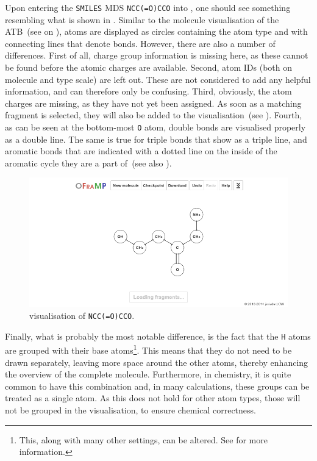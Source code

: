 Upon entering the \verb|SMILES| MDS \verb|NCC(=O)CCO| into \oframp, one should see something resembling what is shown in . Similar to the molecule visualisation of the ATB~(see  on ), atoms are displayed as circles containing the atom type and with connecting lines that denote bonds. However, there are also a number of differences. First of all, charge group information is missing here, as these cannot be found before the atomic charges are available. Second, atom IDs (both on molecule and type scale) are left out. These are not considered to add any helpful information, and can therefore only be confusing. Third, obviously, the atom charges are missing, as they have not yet been assigned. As soon as a matching fragment is selected, they will also be added to the visualisation~(see ). Fourth, as can be seen at the bottom-most \verb|O| atom, double bonds are visualised properly as a double line. The same is true for triple bonds that show as a triple line, and aromatic bonds that are indicated with a dotted line on the inside of the aromatic cycle they are a part of~(see also ).

\begin{figure}
\begin{center}
\includegraphics[width=.9\textwidth]{img/impl_visualising.png}
\caption{\oframp{} visualisation of \texttt{NCC(=O)CCO}.}
\end{center}
\end{figure}

Finally, what is probably the most notable difference, is the fact that the \verb|H| atoms are grouped with their base atoms\footnote{This, along with many other settings, can be altered. See  for more information.}. This means that they do not need to be drawn separately, leaving more space around the other atoms, thereby enhancing the overview of the complete molecule. Furthermore, in chemistry, it is quite common to have this combination and, in many calculations, these groups can be treated as a single atom. As this does not hold for other atom types, those will not be grouped in the \oframp{} visualisation, to ensure chemical correctness.

